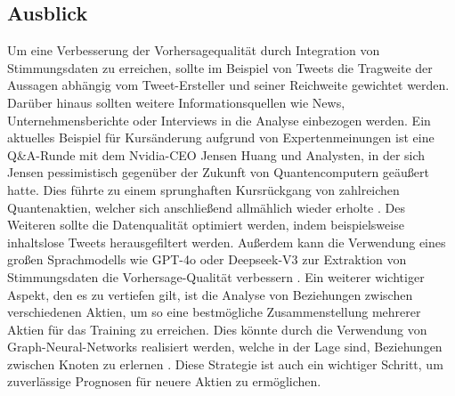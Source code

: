 \subsection{Ausblick}\label{sec:evaluierung_ausblick}
Um eine Verbesserung der Vorhersagequalität durch Integration von Stimmungsdaten zu erreichen, sollte im Beispiel von Tweets die Tragweite der Aussagen abhängig vom Tweet-Ersteller und seiner Reichweite gewichtet werden. Darüber hinaus sollten weitere Informationsquellen wie News, Unternehmensberichte oder Interviews in die Analyse einbezogen werden. Ein aktuelles Beispiel für Kursänderung aufgrund von Expertenmeinungen ist eine Q\&A-Runde mit dem Nvidia-CEO Jensen Huang und Analysten, in der sich Jensen pessimistisch gegenüber der Zukunft von Quantencomputern geäußert hatte. Dies führte zu einem sprunghaften Kursrückgang von zahlreichen Quantenaktien, welcher sich anschließend allmählich wieder erholte \autocite{ntv2025nvidia}\autocite{finanzen2025microsoft}.
Des Weiteren sollte die Datenqualität optimiert werden, indem beispielsweise inhaltslose Tweets herausgefiltert werden. Außerdem kann die Verwendung eines großen Sprachmodells wie GPT-4o oder Deepseek-V3 zur Extraktion von Stimmungsdaten die Vorhersage-Qualität verbessern \autocite{urldeepseek}\autocite{urlchatgpt}.
Ein weiterer wichtiger Aspekt, den es zu vertiefen gilt, ist die Analyse von Beziehungen zwischen verschiedenen Aktien, um so eine bestmögliche Zusammenstellung mehrerer Aktien für das Training zu erreichen. Dies könnte durch die Verwendung von Graph-Neural-Networks realisiert werden, welche in der Lage sind, Beziehungen zwischen Knoten zu erlernen \autocite{qian2024mdgnn}\autocite[Kap. 6]{zhang2022transformer}. Diese Strategie ist auch ein wichtiger Schritt, um zuverlässige Prognosen für neuere Aktien zu ermöglichen.




